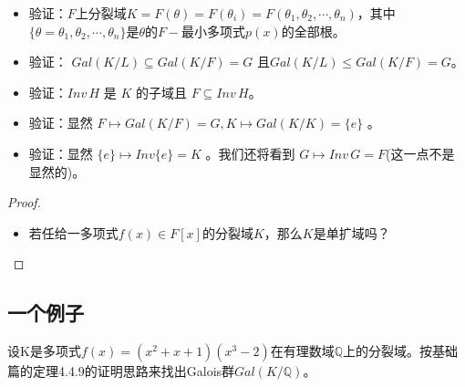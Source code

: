 \begin{proposition}
	\begin{itemize}
		\item 验证：$F$上分裂域$K=F(\theta)=F(\theta_{i})=F(\theta_{1},\theta_{2},\cdots,\theta_{n})$，其中$\{\theta=\theta_{1},\theta_{2},\cdots,\theta_{n}\}$是$\theta$的$F-$最小多项式$p(x)$的全部根。
		\item 验证： $Gal(K/L)\subseteq Gal(K/F)=G $ 且$Gal(K/L)\leq Gal(K/F)=G$。
		\item 验证：$Inv\,H$  是 $K$ 的子域且 $F\subseteq Inv\,H$。
		\item 验证：显然 $F\mapsto Gal(K/F)=G,K\mapsto Gal(K/K)=\{e\}$ 。
		\item 验证：显然 $\{e\}\mapsto Inv\{e\}=K$ 。我们还将看到 $G\mapsto Inv\, G=F$(这一点不是显然的)。
	\end{itemize}
\end{proposition}

\begin{proof}
	\begin{itemize}
		\item {}
		\par
		若任给一多项式$f(x)\in F[x]$的分裂域$K$，那么$K$是单扩域吗？
	\end{itemize}
\end{proof}









\subsection{一个例子}

\begin{example}
	设K是多项式$f(x)=(x^{2}+x+1)(x^{3}-2)$在有理数域$\mathbb{Q}$上的分裂域。按基础篇的定理4.4.9的证明思路来找出Galois群$Gal(K/\mathbb{Q})$。
\end{example}
